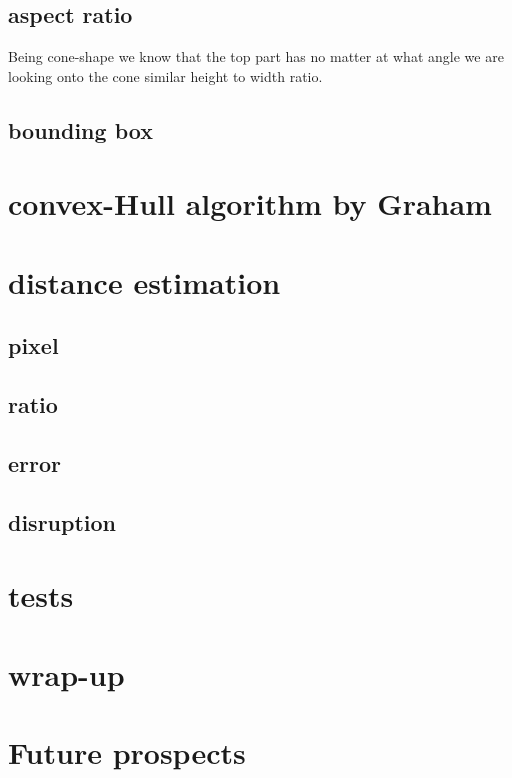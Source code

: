 \documentclass[10pt,a4paper]{article}
\begin{document}
	\subsection{aspect ratio}
	Being cone-shape we know that the top part has no matter at what angle we are looking onto the cone similar height to width ratio. 
	
	\subsection{bounding box}
	
	\section{convex-Hull algorithm by Graham} \label{convex-hull}
	
	\section{distance estimation}
	
	\subsection{pixel}
	
	\subsection{ratio}
	
	\subsection{error}
	
	\subsection{disruption}
	
	\section{tests}
	
	\section{wrap-up}
	
	\section{Future prospects}
	
\end{document}
